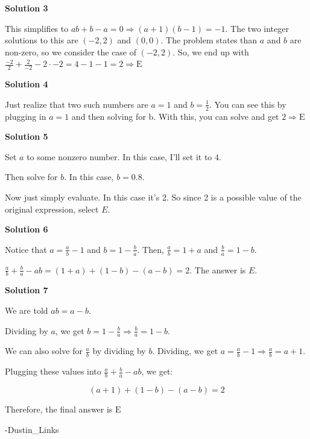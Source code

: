 \begin{enumerate}
\textbf{Solution 3}

This simplifies to $ab+b-a=0 \Rightarrow (a+1)(b-1) = -1$. The two integer solutions to this are $(-2,2)$ and $(0,0)$. The problem states than $a$ and $b$ are non-zero, so we consider the case of $(-2,2)$. So, we end up with $\frac{-2}{2} + \frac{2}{-2} - 2 \cdot -2 = 4 - 1 - 1 = 2 \Rightarrow \boxed{\text{E}}$




\textbf{Solution 4}

Just realize that two such numbers are $a = 1$ and $b = \frac{1}{2}$. You can see this by plugging in $a = 1$ and then solving for b. With this, you can solve and get $2 \Rightarrow\boxed{\text{E}}$




\textbf{Solution 5}

Set $a$ to some nonzero number. In this case, I'll set it to $4$. 

 Then solve for $b$. In this case, $b=0.8$. 

 Now just simply evaluate. In this case it's 2. So since 2 is a possible value of the original expression, select $\boxed{E}$.

 



\textbf{Solution 6}

Notice that $a=\frac{a}{b}-1$ and $b=1-\frac{b}{a}$. Then, $\frac{a}{b}=1+a$ and $\frac{b}{a}=1-b$.

 $\frac{a}{b}+\frac{b}{a}-ab=(1+a)+(1-b)-(a-b)=2$. The answer is $\boxed{E}$.

 



\textbf{Solution 7}

We are told $ab=a-b$.

 Dividing by $a$, we get $b = 1 - \frac{b}{a} \Rightarrow \boxed{ \frac{b}{a} = 1 - b}$.

 We can also solve for $\frac{a}{b}$ by dividing by $b$. Dividing, we get $a = \frac{a}{b} - 1 \Rightarrow \boxed{ \frac{a}{b} = a + 1}$. 

 Plugging these values into $\frac{a}{b} + \frac{b}{a} - ab$, we get:

 
 \[(a + 1) + (1 - b) - (a - b) = 2\]

 Therefore, the final answer is $\boxed{\text{E}}$

 -Dustin\_Links

 


 



\end{enumerate}
